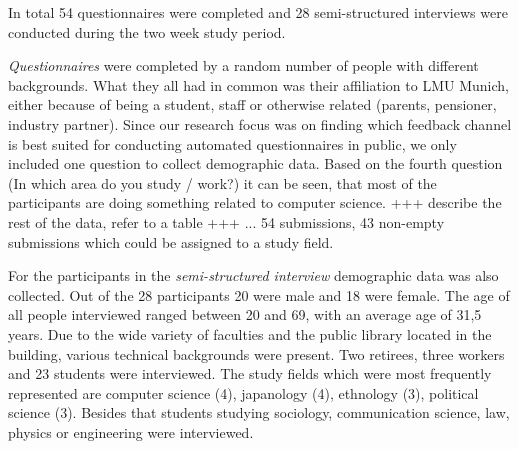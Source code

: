 		In total 54 questionnaires were completed and 28 semi-structured interviews were conducted during the two week study period.

		\textit{Questionnaires} were completed by a random number of people with different backgrounds. What they all had in common was their affiliation to LMU Munich, either because of being a student, staff or otherwise related (parents, pensioner, industry partner). Since our research focus was on finding which feedback channel is best suited for conducting automated questionnaires in public, we only included one question to collect demographic data. Based on the fourth question (In which area do you study / work?) it can be seen, that most of the participants are doing something related to computer science.
			+++ describe the rest of the data, refer to a table +++
		 ... 
			54 submissions, 43 non-empty submissions which could be assigned to a study field.

		For the participants in the \textit{semi-structured interview} demographic data was also collected. Out of the 28 participants
		20 were male and 18 were female. The age of all people interviewed ranged between 20 and 69, with an average age of 31,5 years.
		Due to the wide variety of faculties and the public library located in the building, various technical backgrounds were present. Two retirees, three workers and 23 students were interviewed. The study fields which were most frequently represented are computer science (4), japanology (4), ethnology (3), political science (3). Besides that students studying sociology, communication science, law, physics or engineering were interviewed.


